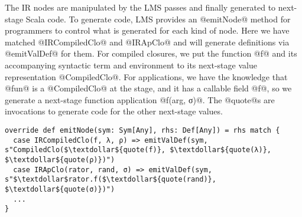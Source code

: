 The IR nodes are manipulated by the LMS passes and finally generated to
next-stage Scala code. To generate code, LMS provides an @emitNode@ method for
programmers to control what is generated for each kind of node. Here we have
matched @IRCompiledClo@ and @IRApClo@ and will generate definitions via @emitValDef@ for them.
For compiled closures, we put the function @f@ and its accompanying syntactic term
and environment to its next-stage value representation @CompiledClo@. For
applications, we have the knowledge that @fun@ is a @CompiledClo@ at the stage,
and it has a callable field @f@, so we generate a next-stage function
application @f(arg, σ)@. The @quote@s are invocations to generate code for the
other next-stage values.
\begin{lstlisting}
override def emitNode(sym: Sym[Any], rhs: Def[Any]) = rhs match {
  case IRCompiledClo(f, λ, ρ) => emitValDef(sym, s"CompiledClo($\textdollar${quote(f)}, $\textdollar${quote(λ)}, $\textdollar${quote(ρ)})")
  case IRApClo(rator, rand, σ) => emitValDef(sym, s"$\textdollar$rator.f($\textdollar${quote(rand)}, $\textdollar${quote(σ)})")
  ...
}
\end{lstlisting}
